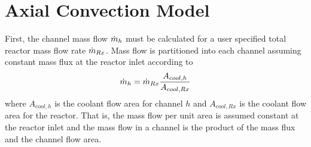 \section{Axial Convection Model}
  \label{sec:axial_convection_model}
  First, the channel mass flow $\dot{m}_h$ must be calculated for a user specified
  total reactor mass flow rate $\dot{m}_{Rx}$.  Mass flow is partitioned into each
  channel assuming constant mass flux at the reactor inlet according to 
  \begin{equation}
    \label{eq:mass_flow_split}
    \dot{m}_h = \dot{m}_{Rx} \frac{A_{cool,h}}{A_{cool,Rx}}
  \end{equation}
  where $A_{cool,h}$ is the coolant flow area for channel $h$ and $A_{cool,Rx}$
  is the coolant flow area for the reactor.  That is, the mass 
  flow per unit area is assumed constant at the reactor inlet and the mass flow 
  in a channel is the product of the mass flux and the channel flow area. 
  
